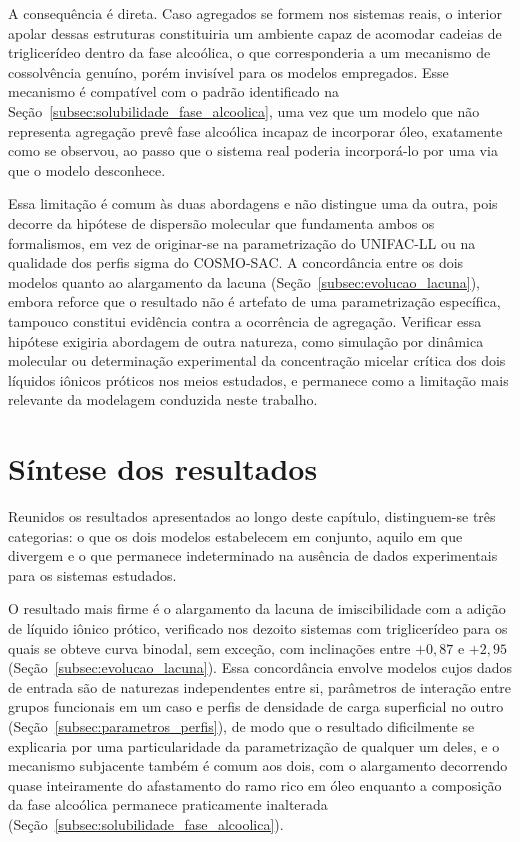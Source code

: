A consequência é direta. Caso agregados se formem nos sistemas reais, o interior apolar dessas estruturas constituiria um ambiente capaz de acomodar cadeias de triglicerídeo dentro da fase alcoólica, o que corresponderia a um mecanismo de cossolvência genuíno, porém invisível para os modelos empregados. Esse mecanismo é compatível com o padrão identificado na Seção~\ref{subsec:solubilidade_fase_alcoolica}, uma vez que um modelo que não representa agregação prevê fase alcoólica incapaz de incorporar óleo, exatamente como se observou, ao passo que o sistema real poderia incorporá-lo por uma via que o modelo desconhece.

Essa limitação é comum às duas abordagens e não distingue uma da outra, pois decorre da hipótese de dispersão molecular que fundamenta ambos os formalismos, em vez de originar-se na parametrização do UNIFAC-LL ou na qualidade dos perfis sigma do COSMO-SAC. A concordância entre os dois modelos quanto ao alargamento da lacuna (Seção~\ref{subsec:evolucao_lacuna}), embora reforce que o resultado não é artefato de uma parametrização específica, tampouco constitui evidência contra a ocorrência de agregação. Verificar essa hipótese exigiria abordagem de outra natureza, como simulação por dinâmica molecular ou determinação experimental da concentração micelar crítica dos dois líquidos iônicos próticos nos meios estudados, e permanece como a limitação mais relevante da modelagem conduzida neste trabalho.

\section{Síntese dos resultados}
\label{subsec:sintese}

Reunidos os resultados apresentados ao longo deste capítulo, distinguem-se três categorias: o que os dois modelos estabelecem em conjunto, aquilo em que divergem e o que permanece indeterminado na ausência de dados experimentais para os sistemas estudados.

O resultado mais firme é o alargamento da lacuna de imiscibilidade com a adição de líquido iônico prótico, verificado nos dezoito sistemas com triglicerídeo para os quais se obteve curva binodal, sem exceção, com inclinações entre $+0{,}87$ e $+2{,}95$ (Seção~\ref{subsec:evolucao_lacuna}). Essa concordância envolve modelos cujos dados de entrada são de naturezas independentes entre si, parâmetros de interação entre grupos funcionais em um caso e perfis de densidade de carga superficial no outro (Seção~\ref{subsec:parametros_perfis}), de modo que o resultado dificilmente se explicaria por uma particularidade da parametrização de qualquer um deles, e o mecanismo subjacente também é comum aos dois, com o alargamento decorrendo quase inteiramente do afastamento do ramo rico em óleo enquanto a composição da fase alcoólica permanece praticamente inalterada (Seção~\ref{subsec:solubilidade_fase_alcoolica}).

